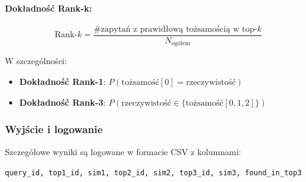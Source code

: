 \paragraph{Dokładność Rank-k:} 
\begin{equation}
\text{Rank-}k = \frac{\text{\# zapytań z prawidłową tożsamością w top-}k}{N_{\text{ogółem}} }
\end{equation}

W szczególności:
\begin{itemize}
    \item \textbf{Dokładność Rank-1}: $P(\text{tożsamość}[0] = \text{rzeczywistość})$
    \item \textbf{Dokładność Rank-3}: $P(\text{rzeczywistość} \in \{\text{tożsamość}[0,1,2]\})$
\end{itemize}

\subsubsection{Wyjście i logowanie}
Szczegółowe wyniki są logowane w formacie CSV z kolumnami:
\begin{lstlisting}
query_id, top1_id, sim1, top2_id, sim2, top3_id, sim3, found_in_top3
\end{lstlisting}